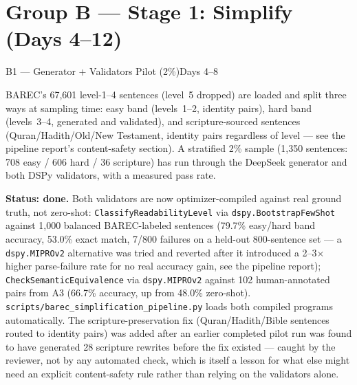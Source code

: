 \documentclass[11pt,a4paper]{article}
\begin{document}
\newpage
\section{Group B --- Stage 1: Simplify (Days 4--12)}

\begin{milestonehead}{B1 --- Generator + Validators Pilot (2\%)}{Days 4--8}
\begin{goalbox}
BAREC's 67,601 level-1--4 sentences (level~5 dropped) are loaded and split
three ways at sampling time: easy band (levels~1--2, identity pairs), hard
band (levels~3--4, generated and validated), and scripture-sourced
sentences (Quran/Hadith/Old/New Testament, identity pairs regardless of
level --- see the pipeline report's content-safety section). A stratified
2\% sample (1,350 sentences: 708 easy / 606 hard / 36 scripture) has run
through the DeepSeek generator and both DSPy validators, with a measured
pass rate.
\end{goalbox}

\textbf{Status: done.} Both validators are now optimizer-compiled against
real ground truth, not zero-shot: \texttt{ClassifyReadabilityLevel} via
\texttt{dspy.BootstrapFewShot} against 1,000 balanced BAREC-labeled
sentences (79.7\% easy/hard band accuracy, 53.0\% exact match, 7/800
failures on a held-out 800-sentence set --- a \texttt{dspy.MIPROv2}
alternative was tried and reverted after it introduced a 2--3$\times$
higher parse-failure rate for no real accuracy gain, see the pipeline
report); \texttt{CheckSemanticEquivalence} via \texttt{dspy.MIPROv2}
against 102 human-annotated pairs from A3 (66.7\% accuracy, up from 48.0\%
zero-shot). \texttt{scripts/barec\_simplification\_pipeline.py} loads both
compiled programs automatically. The scripture-preservation fix
(Quran/Hadith/Bible sentences routed to identity pairs) was added after an
earlier completed pilot run was found to have generated 28 scripture
rewrites before the fix existed --- caught by the reviewer, not by any
automated check, which is itself a lesson for what else might need an
explicit content-safety rule rather than relying on the validators alone.


\end{milestonehead}
\end{document}
